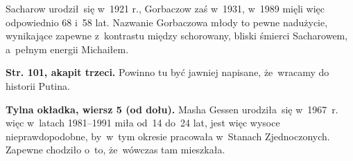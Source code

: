 \documentclass[a4paper,11pt]{article}
\begin{document}
\vspace{\spaceFour}



\start {} Sacharow urodził~się w~1921 r., Gorbaczow zaś w~1931,
w~1989 mięli więc odpowiednio 68 i~58 lat. Nazwanie Gorbaczowa młody
to pewne nadużycie, wynikające zapewne z~kontrastu między schorowany,
bliski śmierci Sacharowem, a~pełnym energii Michaiłem.

\vspace{\spaceFour}



\start \textbf{Str. 101, akapit trzeci.} Powinno tu być jawniej napisane,
że~wracamy do historii Putina.

\vspace{\spaceFour}



\start \textbf{Tylna okładka, wiersz 5 (od dołu).} Masha Gessen
urodziła~się w~1967~r. więc w~latach 1981--1991 miła od~14 do~24 lat,
jest więc wysoce nieprawdopodobne, by~w~tym okresie pracowała
w~Stanach Zjednoczonych. Zapewne chodziło o~to, że~wówczas tam
mieszkała.





\end{document}
